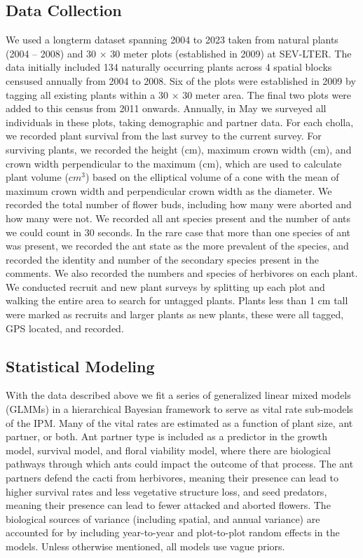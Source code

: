 \documentclass[11pt]{article}
\begin{document}
\subsection*{Data Collection}

We used a longterm dataset spanning 2004 to 2023 taken from natural plants (2004 -- 2008) and 30 $\times$ 30 meter plots (established in 2009) at SEV-LTER. 
The data initially included 134 naturally occurring plants across 4 spatial blocks censused annually from 2004 to 2008.
Six of the plots were established in 2009 by tagging all existing plants within a 30 $\times$ 30 meter area. 
The final two plots were added to this census from 2011 onwards. 
Annually, in May we surveyed all individuals in these plots, taking demographic and partner data. 
For each cholla, we recorded plant survival from the last survey to the current survey. 
For surviving plants, we recorded the height (cm), maximum crown width (cm), and crown width perpendicular to the maximum (cm), which are used to calculate plant volume ($cm^3$) based on the  elliptical volume of a cone with the mean of maximum crown width and perpendicular crown width as the diameter. 
We recorded the total number of flower buds, including how many were aborted and how many were not. 
We recorded all ant species present and the number of ants we could count in 30 seconds.
In the rare case that more than one species of ant was present, we recorded the ant state as the more prevalent of the species, and recorded the identity and number of the secondary species present in the comments. 
We also recorded the numbers and species of herbivores on each plant.
We conducted recruit and new plant surveys by splitting up each plot and walking the entire area to search for untagged plants. 
Plants less than 1 cm tall were marked as recruits and larger plants as new plants, these were all tagged, GPS located, and recorded. 
		
\subsection*{Statistical Modeling}
	
With the data described above we fit a series of generalized linear mixed models (GLMMs) in a hierarchical Bayesian framework to serve as vital rate sub-models of the IPM.
Many of the vital rates are estimated as a function of plant size, ant partner, or both.
Ant partner type is included as a predictor in the growth model, survival model, and floral viability model, where there are biological pathways through which ants could impact the outcome of that process.
The ant partners defend the cacti from herbivores, meaning their presence can lead to higher survival rates and less vegetative structure loss, and seed predators, meaning their presence can lead to fewer attacked and aborted flowers.
The biological sources of variance (including spatial, and annual variance) are accounted for by including year-to-year and plot-to-plot random effects in the models. 
Unless otherwise mentioned, all models use vague priors. 
\end{document}
